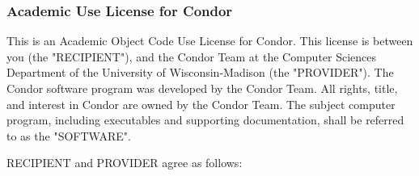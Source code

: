 \subsubsection{\label{Academic-Use-License}
Academic Use License for Condor}

This is an Academic Object Code Use License for Condor. This license
is between you (the "RECIPIENT"), and the Condor Team at the Computer
Sciences Department of the University of Wisconsin-Madison (the
"PROVIDER"). The Condor software program was developed by the Condor
Team. All rights, title, and interest in Condor are owned by the
Condor Team. The subject computer program, including executables and
supporting documentation, shall be referred to as the "SOFTWARE".

RECIPIENT and PROVIDER agree as follows:

